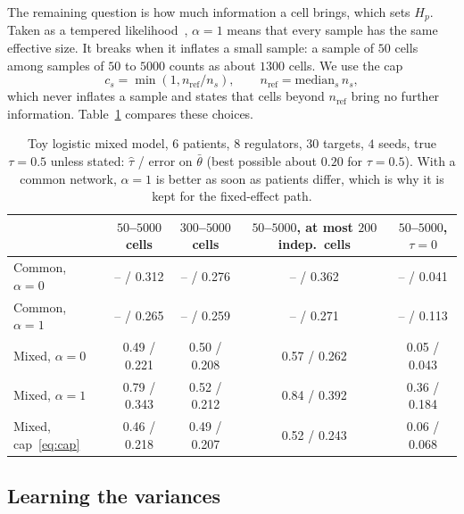 \documentclass[a4paper, 11pt]{article}
\newcommand{\tb}{\bar\theta}
\theoremstyle{plain}
\theoremstyle{remark}
\begin{document}
The remaining question is how much information a cell brings, which sets $H_p$. Taken as a tempered likelihood~\cite{holmes2017power}, $\alpha = 1$ means that every sample has the same effective size. It breaks when it inflates a small sample: a sample of $50$ cells among samples of $50$ to $5000$ counts as about $1300$ cells. We use the cap
\begin{equation}\label{eq:cap}
c_s = \min(1, n_{\mathrm{ref}} / n_s), \qquad n_{\mathrm{ref}} = \mathrm{median}_s\, n_s,
\end{equation}
which never inflates a sample and states that cells beyond $n_{\mathrm{ref}}$ bring no further information. Table~\ref{tab:cells} compares these choices.

\begin{table}[h]
\centering\small
\begin{tabular}{lcccc}
\toprule
 & $50$--$5000$ cells & $300$--$5000$ cells & $50$--$5000$, at most $200$ indep.\ cells & $50$--$5000$, $\tau = 0$ \\
\midrule
Common, $\alpha = 0$ & -- / 0.312 & -- / 0.276 & -- / 0.362 & -- / 0.041 \\
Common, $\alpha = 1$ & -- / 0.265 & -- / 0.259 & -- / 0.271 & -- / 0.113 \\
Mixed, $\alpha = 0$ & 0.49 / 0.221 & 0.50 / 0.208 & 0.57 / 0.262 & 0.05 / 0.043 \\
Mixed, $\alpha = 1$ & 0.79 / 0.343 & 0.52 / 0.212 & 0.84 / 0.392 & 0.36 / 0.184 \\
Mixed, cap~\eqref{eq:cap} & 0.46 / 0.218 & 0.49 / 0.207 & 0.52 / 0.243 & 0.06 / 0.068 \\
\bottomrule
\end{tabular}
\caption{Toy logistic mixed model, $6$ patients, $8$ regulators, $30$ targets, $4$ seeds, true $\tau = 0.5$ unless stated: $\hat\tau$ / error on $\tb$ (best possible about $0.20$ for $\tau = 0.5$). With a common network, $\alpha = 1$ is better as soon as patients differ, which is why it is kept for the fixed-effect path.}\label{tab:cells}
\end{table}

\subsection{Learning the variances}
\end{document}

